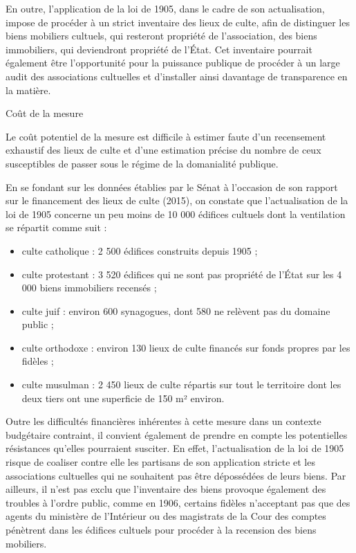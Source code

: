 En outre, l'application de la loi de 1905, dans le cadre de son
actualisation, impose de procéder à un strict inventaire des lieux de
culte, afin de distinguer les biens mobiliers cultuels, qui resteront
propriété de l'association, des biens immobiliers, qui deviendront
propriété de l'État. Cet inventaire pourrait également être
l'opportunité pour la puissance publique de procéder à un large audit
des associations cultuelles et d'installer ainsi davantage de
transparence en la matière.


Coût de la mesure


Le coût potentiel de la mesure est difficile à estimer faute d'un
recensement exhaustif des lieux de culte et d'une estimation précise du
nombre de ceux susceptibles de passer sous le régime de la domanialité
publique.



En se fondant sur les données établies par le Sénat à l'occasion de son
rapport sur le financement des lieux de culte (2015), on constate que
l'actualisation de la loi de 1905 concerne un peu moins de 10 000
édifices cultuels dont la ventilation se répartit comme suit :


\begin{itemize}
\item
  culte catholique : 2 500 édifices construits depuis 1905 ;
\item
  culte protestant : 3 520 édifices qui ne sont pas propriété de l'État
  sur les 4 000 biens immobiliers recensés ;
\item
  culte juif : environ 600 synagogues, dont 580 ne relèvent pas du
  domaine public ;
\item
  culte orthodoxe : environ 130 lieux de culte financés sur fonds
  propres par les fidèles ;
\item
  culte musulman : 2 450 lieux de culte répartis sur tout le territoire
  dont les deux tiers ont une superficie de 150 m² environ.
\end{itemize}


Outre les difficultés financières inhérentes à cette mesure dans un
contexte budgétaire contraint, il convient également de prendre en
compte les potentielles résistances qu'elles pourraient susciter. En
effet, l'actualisation de la loi de 1905 risque de coaliser contre elle
les partisans de son application stricte et les associations cultuelles
qui ne souhaitent pas être dépossédées de leurs biens. Par ailleurs, il
n'est pas exclu que l'inventaire des biens provoque également des
troubles à l'ordre public, comme en 1906, certains fidèles n'acceptant
pas que des agents du ministère de l'Intérieur ou des magistrats de la
Cour des comptes pénètrent dans les édifices cultuels pour procéder à la
recension des biens mobiliers.

